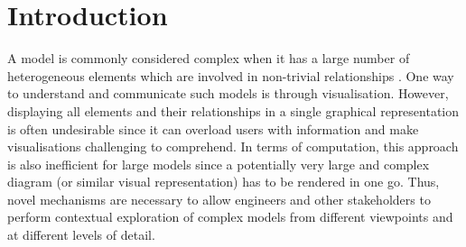 \documentclass[sigconf,review]{acmart}
\begin{document}

\newcommand{\carlos}[1]{{\color{blue} (CJFC) #1}}
\newcommand{\agd}[1]{{\color{DarkGreen} (AGD) #1}}
\newcommand{\dimitris}[1]{\textbf{\color{teal}[Dimitris: #1]}}



\maketitle

\section{Introduction}
\label{sec:introduction}
A model is commonly considered complex when it has a large number of heterogeneous elements which are involved in non-trivial relationships \cite{boccara2010complex,klosterman2012complex}. One way to understand and communicate such models is through visualisation. However, displaying all elements and their relationships in a single graphical representation is often undesirable since it can overload users with information and make visualisations challenging to comprehend. In terms of computation, this approach is also inefficient for large models since a potentially very large and complex diagram (or similar visual representation) has to be rendered in one go. Thus, novel mechanisms are necessary to allow engineers and other stakeholders to perform contextual exploration of complex models from different viewpoints and at different levels of detail. 
\end{document}
